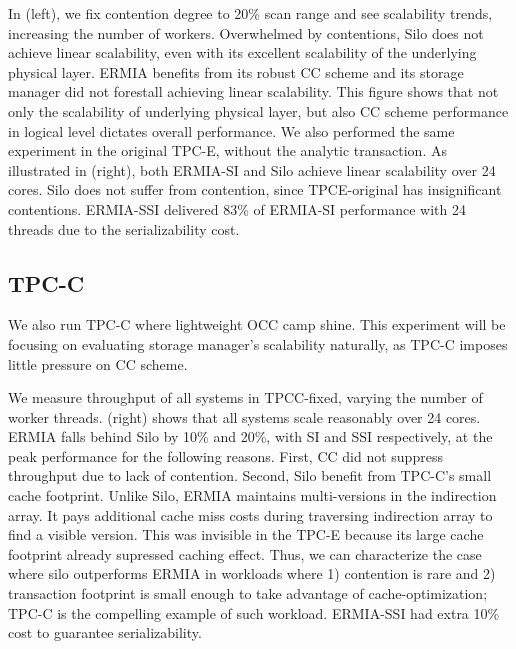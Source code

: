 In  (left), we fix contention degree to 20\% scan range and see scalability trends, increasing the number of workers. Overwhelmed by contentions, Silo does not achieve linear scalability, even with its excellent scalability of the underlying physical layer. ERMIA benefits from its robust CC scheme and its storage manager did not forestall achieving linear scalability. This figure shows that not only the scalability of underlying physical layer, but also CC scheme performance in logical level dictates overall performance. We also performed the same experiment in the original TPC-E, without the analytic transaction. As illustrated in  (right), both ERMIA-SI and Silo achieve linear scalability over 24 cores. Silo does not suffer from contention, since TPCE-original has insignificant contentions. ERMIA-SSI delivered 83\% of ERMIA-SI performance with 24 threads due to the serializability cost.

\subsection{TPC-C} 
We also run TPC-C where lightweight OCC camp shine. This experiment will be focusing on evaluating storage manager's scalability naturally, as TPC-C imposes little pressure on CC scheme. 

We measure throughput of all systems in TPCC-fixed, varying the number of worker threads.  (right) shows that all systems scale reasonably over 24 cores. ERMIA falls behind Silo by 10\% and 20\%, with SI and SSI respectively, at the peak performance for the following reasons. First, CC did not suppress throughput due to lack of contention. Second, Silo benefit from TPC-C's small cache footprint. Unlike Silo, ERMIA maintains multi-versions in the indirection array. It pays additional cache miss costs during traversing indirection array to find a visible version. This was invisible in the TPC-E because its large cache footprint already supressed caching effect. Thus, we can characterize the case where silo outperforms ERMIA in workloads where 1) contention is rare and 2) transaction footprint is small enough to take advantage of cache-optimization; TPC-C is the compelling example of such workload. ERMIA-SSI had extra 10\% cost to guarantee serializability.


